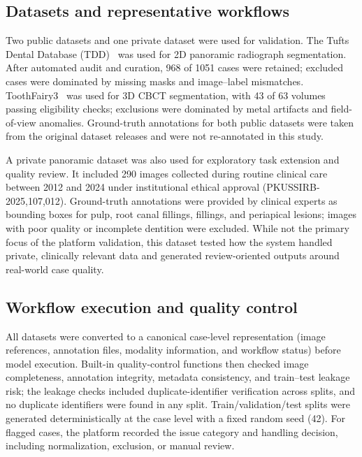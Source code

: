 \documentclass[final,5p,times,twocolumn]{elsarticle}
\begin{document}
\subsection{Datasets and representative workflows}
Two public datasets and one private dataset were used for validation. The Tufts Dental Database (TDD)~\cite{panetta2022tufts} was used for 2D panoramic radiograph segmentation. After automated audit and curation, 968 of 1051 cases were retained; excluded cases were dominated by missing masks and image--label mismatches. ToothFairy3~\cite{ToothFairyDataset1,ToothFairyDataset2,ToothFairyDataset3} was used for 3D CBCT segmentation, with 43 of 63 volumes passing eligibility checks; exclusions were dominated by metal artifacts and field-of-view anomalies. Ground-truth annotations for both public datasets were taken from the original dataset releases and were not re-annotated in this study.

A private panoramic dataset was also used for exploratory task extension and quality review. It included 290 images collected during routine clinical care between 2012 and 2024 under institutional ethical approval (PKUSSIRB-2025,107,012). Ground-truth annotations were provided by clinical experts as bounding boxes for pulp, root canal fillings, fillings, and periapical lesions; images with poor quality or incomplete dentition were excluded. While not the primary focus of the platform validation, this dataset tested how the system handled private, clinically relevant data and generated review-oriented outputs around real-world case quality.

\subsection{Workflow execution and quality control}
All datasets were converted to a canonical case-level representation (image references, annotation files, modality information, and workflow status) before model execution. Built-in quality-control functions then checked image completeness, annotation integrity, metadata consistency, and train--test leakage risk; the leakage checks included duplicate-identifier verification across splits, and no duplicate identifiers were found in any split. Train/validation/test splits were generated deterministically at the case level with a fixed random seed (42). For flagged cases, the platform recorded the issue category and handling decision, including normalization, exclusion, or manual review.
\end{document}
